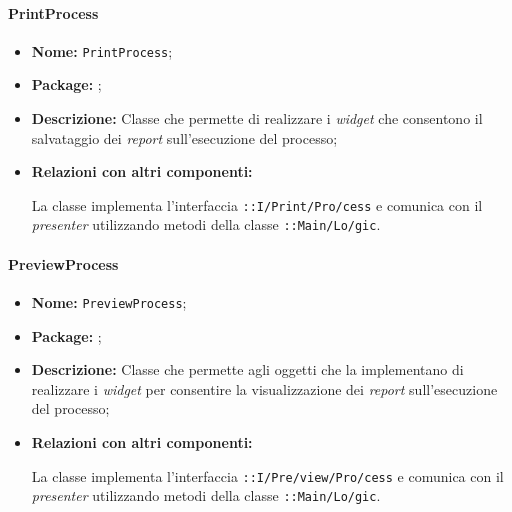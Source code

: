 \paragraph{PrintProcess}
\begin{flushleft}
\begin{itemize}
\item \textbf{Nome:} \texttt{PrintProcess};
\item \textbf{Package:} \texttt{\viewUser{}};
\item \textbf{Descrizione:} Classe che permette di realizzare i \textit{widget} che consentono il salvataggio dei \textit{report} sull'esecuzione del processo;
\item \textbf{Relazioni con altri componenti:}
\begin{sloppypar}
La classe implementa l'interfaccia \texttt{\iViewUser{}::I\fshyp{}Print\fshyp{}Pro\fshyp{}cess} e comunica con il \textit{presenter} utilizzando metodi della classe \texttt{\logicUser{}::Main\fshyp{}Lo\fshyp{}gic}.
\end{sloppypar}
\end{itemize}
\end{flushleft}

\paragraph{PreviewProcess}
\begin{flushleft}
\begin{itemize}
\item \textbf{Nome:} \texttt{PreviewProcess};
\item \textbf{Package:} \texttt{\viewUser{}};
\item \textbf{Descrizione:} Classe che permette agli oggetti che la implementano di realizzare i \textit{widget} per consentire la visualizzazione dei \textit{report} sull'esecuzione del processo;
\item \textbf{Relazioni con altri componenti:}
\begin{sloppypar}
La classe implementa l'interfaccia \texttt{\iViewUser{}::I\fshyp{}Pre\fshyp{}view\fshyp{}Pro\fshyp{}cess} e comunica con il \textit{presenter} utilizzando metodi della classe \texttt{\logicUser{}::Main\fshyp{}Lo\fshyp{}gic}.
\end{sloppypar}
\end{itemize}
\end{flushleft}